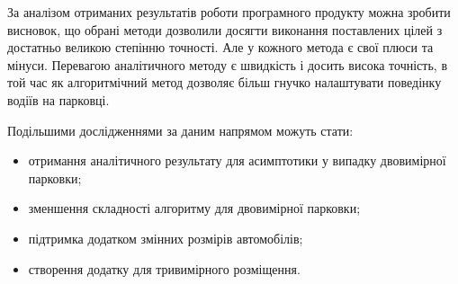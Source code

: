 За аналізом отриманих результатів роботи програмного продукту можна зробити висновок, що обрані методи дозволили досягти виконання поставлених цілей з достатньо великою степінню точності. Але у кожного метода є свої плюси та мінуси. Перевагою аналітичного методу є швидкість і досить висока точність, в той час як алгоритмічний метод дозволяє більш гнучко налаштувати поведінку водіїв на парковці.

Подільшими дослідженнями за даним напрямом можуть стати:
\begin{itemize}
\item отримання аналітичного результату для асимптотики у випадку двовимірної парковки;
\item зменшення складності алгоритму для двовимірної парковки;
\item підтримка додатком змінних розмірів автомобілів;
\item створення додатку для тривимірного розміщення.
\end{itemize}

